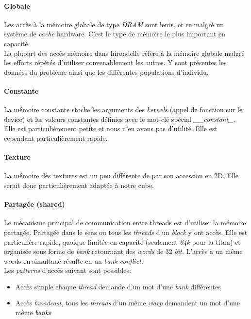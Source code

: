 \documentclass[french, 11pt]{memoir}
\begin{document}
\paragraph{Globale}\label{globale}

Les accès à la mémoire globale de type \emph{DRAM} sont lents, et ce
malgré un système de \emph{cache} hardware. C'est le type de mémoire le
plus important en capacité. \\
La plupart des accès mémoire dans hirondelle réfère à la mémoire globale
malgré les efforts répétés d'utiliser convenablement les autres. Y sont
présentes les données du problème ainsi que les différentes populations
d'individu.

\paragraph{Constante}\label{constante}

La mémoire constante stocke les arguments des \emph{kernels} (appel de
fonction sur le device) et les valeurs constantes définies avec le
mot-clé spécial \textit{\_\_constant\_}. Elle est particulièrement petite et
nous n'en avons pas d'utilité. Elle est cependant particulièrement
rapide.

\paragraph{Texture}\label{texture}

La mémoire des textures est un peu différente de par son accession en
2D. Elle serait donc particulièrement adaptée à notre cube.

\paragraph{Partagée (shared)}\label{partaguxe9e-shared}

Le mécanisme principal de communication entre threads est d'utiliser la
mémoire partagée. Partagée dans le sens ou tous les \emph{threads} d'un
\emph{block} y ont accès. Elle est particulière rapide, quoique limitée
en capacité (seulement \emph{64k} pour la titan) et organisée sous forme
de \emph{bank} retournant des \emph{words} de 32 \emph{bit}. L'accès a
un même words en simultané résulte en un \emph{bank conflict}. \\
Les
\emph{patterns} d'accès suivant sont possibles:

\begin{itemize}
\item
  Accès simple chaque \emph{thread} demande d'un mot d'une \textit{bank}
  différentes
\item
  Accès \textit{broadcast}, tous les \textit{threads} d'un même \emph{warp}
  demandent un mot d'une même \emph{banks}
\end{itemize}
\end{document}
